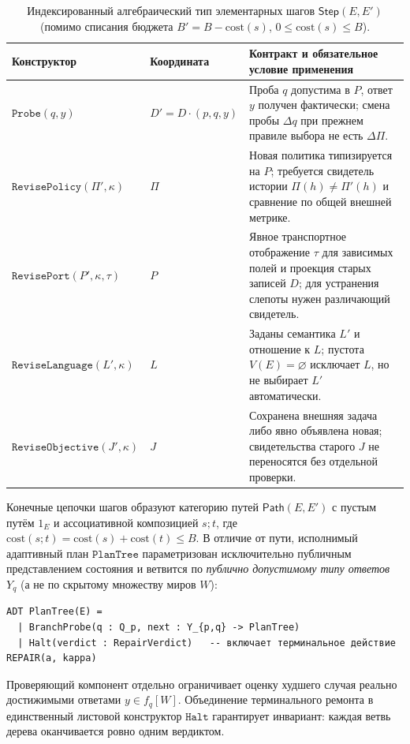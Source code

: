 \documentclass[11pt,a4paper]{article}
\theoremstyle{preprintthm}
\theoremstyle{preprintdef}
\begin{document}
\begin{table}[!htbp]
\centering
\caption{Индексированный алгебраический тип элементарных шагов $\mathsf{Step}(E,E')$ (помимо списания бюджета $B'=B-\mathrm{cost}(s)$, $0\le\mathrm{cost}(s)\le B$).}
\label{tab:steps}
\footnotesize
\begin{tabularx}{\linewidth}{@{}l l >{\raggedright\arraybackslash}X@{}}
\toprule
\textbf{Конструктор} & \textbf{Координата} & \textbf{Контракт и обязательное условие применения} \\
\midrule
$\texttt{Probe}(q,y)$ & $D'\!=\!D\cdot(p,q,y)$ & Проба $q$ допустима в $P$, ответ $y$ получен фактически; смена пробы $\Delta q$ при прежнем правиле выбора не есть $\Delta\Pi$. \\
$\texttt{RevisePolicy}(\Pi',\kappa)$ & $\Pi$ & Новая политика типизируется на $P$; требуется свидетель истории $\Pi(h)\ne\Pi'(h)$ и сравнение по общей внешней метрике. \\
$\texttt{RevisePort}(P',\kappa,\tau)$ & $P$ & Явное транспортное отображение $\tau$ для зависимых полей и проекция старых записей $D$; для устранения слепоты нужен различающий свидетель. \\
$\texttt{ReviseLanguage}(L',\kappa)$ & $L$ & Заданы семантика $L'$ и отношение к $L$; пустота $V(E)=\varnothing$ исключает $L$, но не выбирает $L'$ автоматически. \\
$\texttt{ReviseObjective}(J',\kappa)$ & $J$ & Сохранена внешняя задача либо явно объявлена новая; свидетельства старого $J$ не переносятся без отдельной проверки. \\
\bottomrule
\end{tabularx}
\end{table}

Конечные цепочки шагов образуют категорию путей $\mathsf{Path}(E,E')$ с пустым путём $1_E$ и ассоциативной композицией $s;t$, где $\mathrm{cost}(s;t)=\mathrm{cost}(s)+\mathrm{cost}(t)\le B$. В отличие от пути, исполнимый адаптивный план $\texttt{PlanTree}$ параметризован исключительно публичным представлением состояния и ветвится по \emph{публично допустимому типу ответов} $Y_q$ (а не по скрытому множеству миров $W$):
\begin{lstlisting}[caption={Безопасный контракт адаптивного дерева планов без утечки скрытого пространства миров $W$.}]
ADT PlanTree(E) =
  | BranchProbe(q : Q_p, next : Y_{p,q} -> PlanTree)
  | Halt(verdict : RepairVerdict)   -- включает терминальное действие REPAIR(a, kappa)
\end{lstlisting}
Проверяющий компонент отдельно ограничивает оценку худшего случая реально достижимыми ответами $y\in f_q[W]$. Объединение терминального ремонта в единственный листовой конструктор $\texttt{Halt}$ гарантирует инвариант: каждая ветвь дерева оканчивается ровно одним вердиктом.
\end{document}
